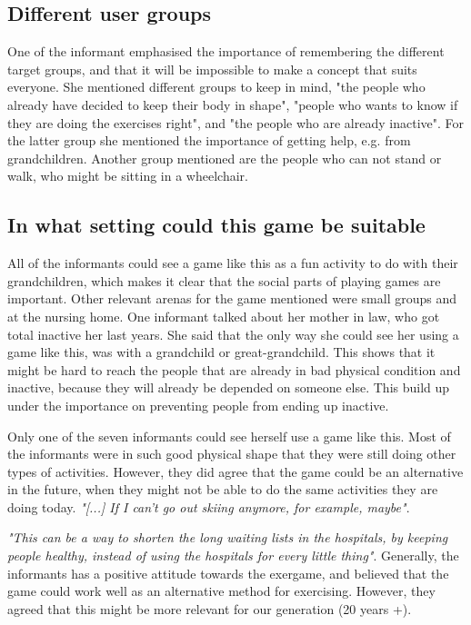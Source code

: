 \subsection{Different user groups}
One of the informant emphasised the importance of remembering the different target groups, and that it will be impossible to make a concept that suits everyone. She mentioned different groups to keep in mind, "the people who already have decided to keep their body in shape", "people who wants to know if they are doing the exercises right", and "the people who are already inactive". For the latter group she mentioned the importance of getting help, e.g. from grandchildren.  Another group mentioned are the people who can not stand or walk, who might be sitting in a wheelchair.

\subsection{In what setting could this game be suitable}
All of the informants could see a game like this as a fun activity to do with their grandchildren, which makes it clear that the social parts of playing games are important. Other relevant arenas for the game mentioned were small groups and at the nursing home. One informant talked about her mother in law, who got total inactive her last years. She said that the only way she could see her using a game like this, was with a grandchild or great-grandchild. This shows that it might be hard to reach the people that are already in bad physical condition and inactive, because they will already be depended on someone else. This build up under the importance on preventing people from ending up inactive.

Only one of the seven informants could see herself use a game like this. Most of the informants were in such good physical shape that they were still doing other types of activities. However, they did agree that the game could be an alternative in the future, when they might not be able to do the same activities they are doing today. \emph{"[...] If I can't go out skiing anymore, for example, maybe"}. 

\emph{"This can be a way to shorten the long waiting lists in the hospitals, by keeping people healthy, instead of using the hospitals for every little thing"}. Generally, the informants has a positive attitude towards the exergame, and believed that the game could work well as an alternative method for exercising. However, they agreed that this might be more relevant for our generation (20 years +). 

